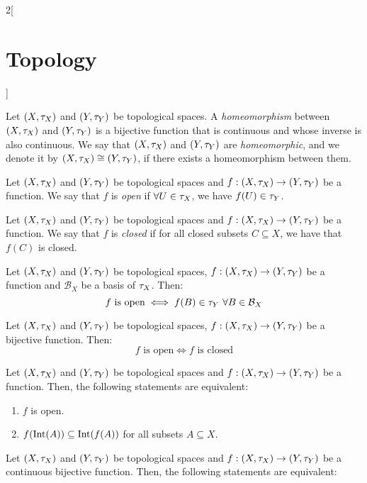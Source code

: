 \documentclass[../../../main_math.tex]{subfiles}
\begin{document}
\begin{multicols}{2}[\section{Topology}]
\begin{proposition}
  \end{proposition}
  \begin{definition}
    Let $(X,\tau_X)$ and $(Y,\tau_Y)$ be topological spaces. A \emph{homeomorphism} between $(X,\tau_X)$ and $(Y,\tau_Y)$ is a bijective function that is continuous and whose inverse is also continuous. We say that $(X,\tau_X)$ and $(Y,\tau_Y)$ are \emph{homeomorphic}, and we denote it by $(X,\tau_X)\cong(Y,\tau_Y)$, if there exists a homeomorphism between them.
  \end{definition}
  \begin{definition}
    Let $(X,\tau_X)$ and $(Y,\tau_Y)$ be topological spaces and $f:(X,\tau_X)\rightarrow (Y,\tau_Y)$ be a function. We say that $f$ is \emph{open} if $\forall U\in\tau_X$, we have $f(U)\in \tau_Y$.
  \end{definition}
  \begin{definition}
    Let $(X,\tau_X)$ and $(Y,\tau_Y)$ be topological spaces and $f:(X,\tau_X)\rightarrow (Y,\tau_Y)$ be a function. We say that $f$ is \emph{closed} if for all closed subsets $C\subseteq X$, we have that $f(C)$ is closed.
  \end{definition}
  \begin{theorem}
    Let $(X,\tau_X)$ and $(Y,\tau_Y)$ be topological spaces, $f:(X,\tau_X)\rightarrow (Y,\tau_Y)$ be a function and $\mathcal{B}_X$ be a basis of $\tau_X$. Then: $$f\text{ is open}\iff f(B)\in\tau_Y\ \forall B\in \mathcal{B}_X$$
  \end{theorem}
  \begin{theorem}
    Let $(X,\tau_X)$ and $(Y,\tau_Y)$ be topological spaces, $f:(X,\tau_X)\rightarrow (Y,\tau_Y)$ be a bijective function. Then: $$f\text{ is open}\iff f\text{ is closed}$$
  \end{theorem}
  \begin{proposition}
    Let $(X,\tau_X)$ and $(Y,\tau_Y)$ be topological spaces and $f:(X,\tau_X)\rightarrow (Y,\tau_Y)$ be a function. Then, the following statements are equivalent:
    \begin{enumerate}
      \item $f$ is open.
      \item $f(\operatorname{Int}(A))\subseteq \operatorname{Int}(f(A))$ for all subsets $A\subseteq X$.
    \end{enumerate}
  \end{proposition}
  \begin{proposition}
    Let $(X,\tau_X)$ and $(Y,\tau_Y)$ be topological spaces and $f:(X,\tau_X)\rightarrow (Y,\tau_Y)$ be a continuous bijective function. Then, the following statements are equivalent:

\end{proposition}
\end{multicols}
\end{document}
